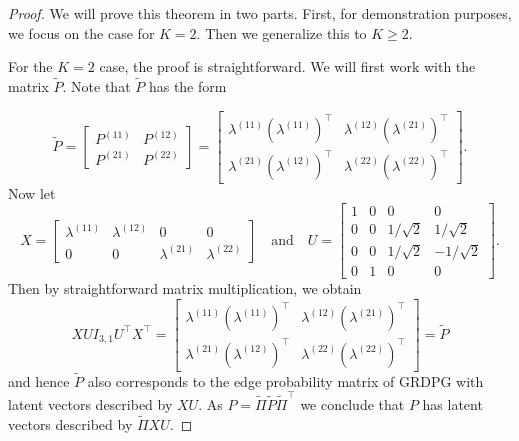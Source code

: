 \documentclass[12pt]{article}
\begin{document}
\begin{proof}
We will prove this theorem in two parts. First, for demonstration purposes, we focus on the case for $K = 2$. Then we generalize this to $K \geq 2$. 

For the $K = 2$ case, the proof is straightforward. We will first work with
the matrix $\tilde{P}$. Note that $\tilde{P}$ has the form

$$\tilde{P} = \begin{bmatrix} P^{(11)} & P^{(12)} \\ P^{(21)} &
  P^{(22)} \end{bmatrix} = \begin{bmatrix} \lambda^{(11)} (\lambda^{(11)})^\top & \lambda^{(12)} (\lambda^{(21)})^\top \\
  \lambda^{(21)} (\lambda^{(12)})^\top & \lambda^{(22)}
  (\lambda^{(22)})^\top \end{bmatrix}.$$
  Now let
$$X = \begin{bmatrix}
\lambda^{(11)} & \lambda^{(12)} & 0 & 0 \\
0 & 0 & \lambda^{(21)} & \lambda^{(22)}
\end{bmatrix} \quad \text{and} \quad
U = \begin{bmatrix} 1 & 0 & 0 & 0 \\
0 & 0 & 1 / \sqrt{2} & 1 / \sqrt{2} \\
0 & 0 & 1 / \sqrt{2} & - 1 / \sqrt{2} \\
0 & 1 & 0 & 0 \end{bmatrix}.$$
Then by straightforward matrix multiplication, we obtain 
$$X U I_{3, 1} U^\top X^\top =
\begin{bmatrix}
  \lambda^{(11)} (\lambda^{(11)})^\top & \lambda^{(12)} (\lambda^{(21)})^\top \\
  \lambda^{(21)} (\lambda^{(12)})^\top & \lambda^{(22)} (\lambda^{(22)})^\top
\end{bmatrix} = \tilde{P}$$
and hence $\tilde{P}$ also corresponds to the edge probability matrix of GRDPG
with latent vectors described by $X U$. As $P = \tilde{\Pi} \tilde{P}
\tilde{\Pi}^{\top}$ we conclude that $P$ has latent vectors described
by $\tilde{\Pi} X U$. 


\end{proof}
\end{document}
